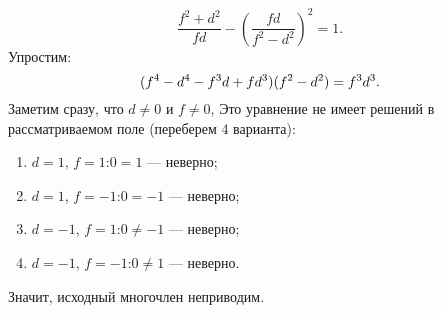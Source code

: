 \begin{solution}
\begin{enumerate}
\begin{equation*}
     \frac{f^2+d^2}{fd} - \left(\frac{fd}{f^2-d^2}\right)^2 = 1.
\end{equation*}
Упростим:
\begin{equation*}
     (f^4 - d^4 - f^3d + fd^3)(f^2 - d^2) = f^3d^3\\.
\end{equation*}
Заметим сразу, что $d \neq 0$ и $f \neq 0$, 
Это уравнение не имеет решений в рассматриваемом поле (переберем 4 варианта):
    \begin{enumerate}
        \item $d = 1$, $f = 1$:\quad $0 = 1$ --- неверно;\\
        \item $d = 1$, $f = -1$:\quad $0 = -1$ --- неверно;\\
        \item $d = -1$, $f = 1$:\quad $0 \neq -1$ --- неверно;\\
        \item $d = -1$, $f = -1$:\quad $0 \neq 1$ --- неверно.\\
    \end{enumerate}

\end{enumerate}
\par Значит, исходный многочлен неприводим.
\end{solution}